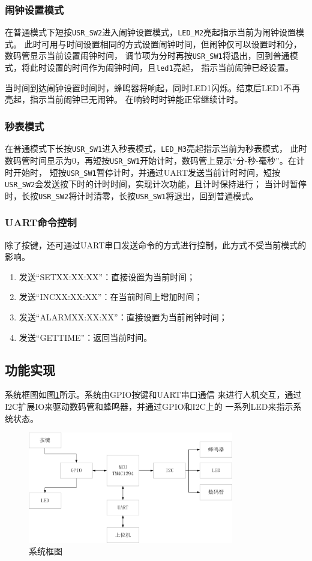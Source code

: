 \documentclass[12pt, a4paper, oneside]{ctexart}
\begin{document}
    \subsubsection{闹钟设置模式}
    在普通模式下短按\verb|USR_SW2|进入闹钟设置模式，\verb|LED_M2|亮起指示当前为闹钟设置模式。
    此时可用与时间设置相同的方式设置闹钟时间，但闹钟仅可以设置时和分，数码管显示当前设置闹钟时间，
    调节项为分时再按\verb|USR_SW1|将退出，回到普通模式，将此时设置的时间作为闹钟时间，且\verb|led1|亮起，
    指示当前闹钟已经设置。

    当时间到达闹钟设置时间时，蜂鸣器将响起，同时LED1闪烁。结束后LED1不再亮起，指示当前闹钟已无闹钟。
    在响铃时时钟能正常继续计时。
    \subsubsection{秒表模式}
    在普通模式下长按\verb|USR_SW1|进入秒表模式，\verb|LED_M3|亮起指示当前为秒表模式，
    此时数码管时间显示为0，再短按\verb|USR_SW1|开始计时，数码管上显示“分-秒-毫秒”。在计时开始时，
    短按\verb|USR_SW1|暂停计时，并通过UART发送当前计时时间，短按\verb|USR_SW2|会发送按下时的计时时间，实现计次功能，且计时保持进行；
    当计时暂停时，长按\verb|USR_SW2|将计时清零，长按\verb|USR_SW1|将退出，回到普通模式。
    \subsubsection{UART命令控制}
    除了按键，还可通过UART串口发送命令的方式进行控制，此方式不受当前模式的影响。
    \begin{enumerate}
        \item 发送“SETXX:XX:XX”：直接设置为当前时间；
        \item 发送“INCXX:XX:XX”：在当前时间上增加时间；
        \item 发送“ALARMXX:XX:XX”：直接设置为当前闹钟时间；
        \item 发送“GETTIME”：返回当前时间。
    \end{enumerate}
    \subsection{功能实现}
    
    系统框图如图\ref{fig:system}所示。系统由GPIO按键和UART串口通信
    来进行人机交互，通过I2C扩展IO来驱动数码管和蜂鸣器，并通过GPIO和I2C上的
    一系列LED来指示系统状态。
    \begin{figure}[h]
        \centering
        \includegraphics[width=0.8\textwidth]{./img/system.png}
        \caption{系统框图}
        \label{fig:system}
    \end{figure}
    
\end{document}
